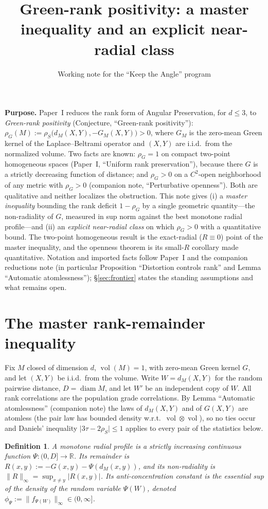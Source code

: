 \documentclass[11pt]{article}
\title{Green-rank positivity: a master inequality and an explicit near-radial class}
\author{Working note for the ``Keep the Angle'' program}
\date{}
\newtheorem{definition}[theorem]{Definition}
\theoremstyle{remark}
\newcommand{\vol}{\operatorname{vol}}
\newcommand{\diam}{\operatorname{diam}}
\newcommand{\Rem}{R}
\newcommand{\dM}{d_M}
\newcommand{\rhoG}{\rho_G}
\begin{document}
\maketitle

\noindent\textbf{Purpose.} Paper~I reduces the rank form of Angular Preservation, for
$d\le3$, to \emph{Green-rank positivity} (Conjecture, ``Green-rank positivity''):
$\rhoG(M):=\rho_S\bigl(\dM(X,Y),-G_M(X,Y)\bigr)>0$, where $G_M$ is the zero-mean Green
kernel of the Laplace--Beltrami operator and $(X,Y)$ are i.i.d.\ from the normalized
volume. Two facts are known: $\rhoG=1$ on compact two-point homogeneous spaces
(Paper~I, ``Uniform rank preservation''), because there $G$ is a strictly decreasing
function of distance; and $\rhoG>0$ on a $C^2$-open neighborhood of any metric with
$\rhoG>0$ (companion note, ``Perturbative openness''). Both are qualitative and neither
localizes the obstruction. This note gives (i) a \emph{master inequality} bounding the
rank deficit $1-\rhoG$ by a single geometric quantity---the non-radiality of $G$,
measured in sup norm against the best monotone radial profile---and (ii) an
\emph{explicit near-radial class} on which $\rhoG>0$ with a quantitative bound. The
two-point homogeneous result is the exact-radial ($\Rem\equiv0$) point of the master
inequality, and the openness theorem is its small-$\Rem$ corollary made quantitative.
Notation and imported facts follow Paper~I and the companion reductions note (in
particular Proposition ``Distortion controls rank'' and Lemma ``Automatic
atomlessness''); §\ref{sec:frontier} states the standing assumptions and what remains
open.

\section{The master rank-remainder inequality}

Fix $M$ closed of dimension $d$, $\vol(M)=1$, with zero-mean Green kernel $G$, and let
$(X,Y)$ be i.i.d.\ from the volume. Write $W=\dM(X,Y)$ for the random pairwise distance,
$D=\diam M$, and let $W'$ be an independent copy of $W$. All rank correlations are the
population grade correlations. By Lemma ``Automatic atomlessness'' (companion note) the
laws of $\dM(X,Y)$ and of $G(X,Y)$ are atomless (the pair law has bounded density
w.r.t.\ $\vol\otimes\vol$), so no ties occur and Daniels' inequality
$\lvert3\tau-2\rho_S\rvert\le1$ applies to every pair of the statistics below.

\begin{definition}
A \emph{monotone radial profile} is a strictly increasing continuous function
$\Psi:(0,D]\to\mathbb R$. Its \emph{remainder} is $\Rem(x,y):=-G(x,y)-\Psi(\dM(x,y))$,
and its \emph{non-radiality} is $\lVert\Rem\rVert_\infty=\sup_{x\ne y}\lvert\Rem(x,y)\rvert$.
Its \emph{anti-concentration constant} is the essential sup of the density of the random
variable $\Psi(W)$, denoted $\phi_\Psi:=\lVert f_{\Psi(W)}\rVert_\infty\in(0,\infty]$.
\end{definition}
\end{document}

